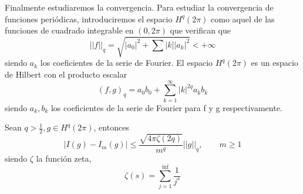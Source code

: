 Finalmente estudiaremos la convergencia. Para estudiar la convergencia de funciones periódicas, introduciremos el espacio $H^q(2\pi)$ como aquel de las funciones de cuadrado integrable en $(0,2\pi)$ que verifican que 
$$
||f||_q = \sqrt{|a_0|^2+\sum_{}^{}|k||a_k|^2} < +\infty
$$
siendo $a_k$ los coeficientes de la serie de Fourier.
El espacio $H^q(2\pi)$ es un espacio de Hilbert con el producto escalar 
$$ (f,g)_q = a_0b_0 + \sum_{k=1}^{\infty}|k|^{2q} a_kb_k $$ siendo $a_k,b_k$ los coeficientes de la serie de Fourier para f y g respectivamente. 

\begin{thm}Sean $q > \frac{1}{2}, g\in H^q(2\pi)$, entonces
	$$
	| I(g) - I_m(g) | \le \frac{\sqrt{4\pi\zeta(2q)}}{m^q} ||g||_q, \qquad m\ge 1
	$$  
	siendo $\zeta$ la función zeta,
	$$\zeta(s) = \sum_{j=1}^{\inf} \frac{1}{j^s}$$
\end{thm}


